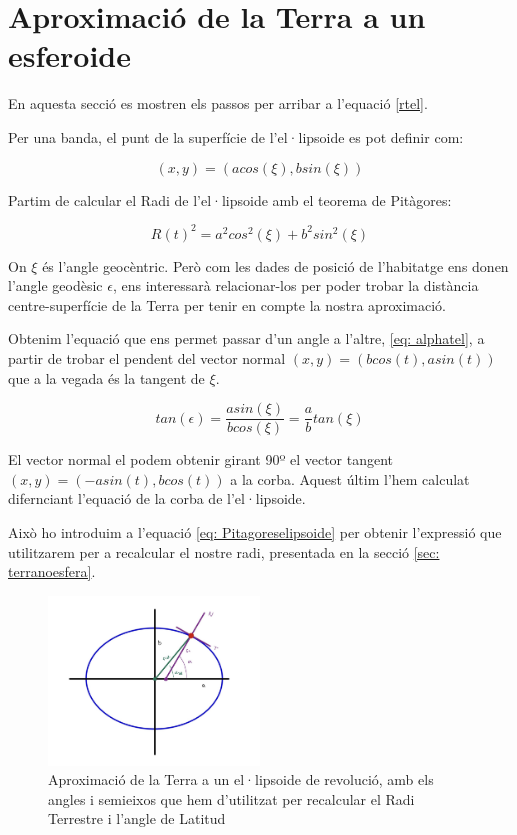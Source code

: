 \documentclass[11pt]{article}
\begin{document}
\section{Aproximació de la Terra a un esferoide}
\label{sec: terraesferoidedibuix}
En aquesta secció es mostren els passos per arribar a l'equació \eqref{rtel}.

Per una banda, el punt de la superfície de l'el·lipsoide es pot definir com:

\begin{equation}
    (x,y) = (acos(\xi),bsin(\xi))
\end{equation}

Partim de calcular el Radi de l'el·lipsoide amb el teorema de Pitàgores:

\begin{equation}
    R(t)^2 = a^2cos^2(\xi) + b^2sin^2(\xi)
    \label{eq: Pitagoreselipsoide}
\end{equation}

On $\xi$ és l'angle geocèntric. Però com les dades de posició de l'habitatge ens donen l'angle geodèsic $\epsilon$, ens interessarà relacionar-los per poder trobar la distància centre-superfície de la Terra per tenir en compte la nostra aproximació.

Obtenim l'equació que ens permet passar d'un angle a l'altre, \eqref{eq: alphatel}, a partir de trobar el pendent del vector normal $(x,y) = (bcos(t), asin(t))$ que a la vegada és la tangent de $\xi$.

\begin{equation}
    tan(\epsilon) = \frac{asin(\xi)}{bcos(\xi)} = \frac{a}{b}tan(\xi)
\end{equation}

El vector normal el podem obtenir girant 90º el vector tangent $(x,y) = (-asin(t),bcos(t))$ a la corba. Aquest últim l'hem calculat difernciant l'equació de la corba de l'el·lipsoide.

Això ho introduim a l'equació \eqref{eq: Pitagoreselipsoide} per obtenir l'expressió que utilitzarem per a recalcular el nostre radi, presentada en la secció \ref{sec: terranoesfera}.

\begin{figure}[H]
    \centering
    \includegraphics[width=0.5\textwidth]{Terraelipsoide.jpg}
    \caption{Aproximació de la Terra a un el·lipsoide de revolució, amb els angles i semieixos que hem d'utilitzat per recalcular el Radi Terrestre i l'angle de Latitud}
    \label{fig:terraelipsoide}
\end{figure}
\end{document}
